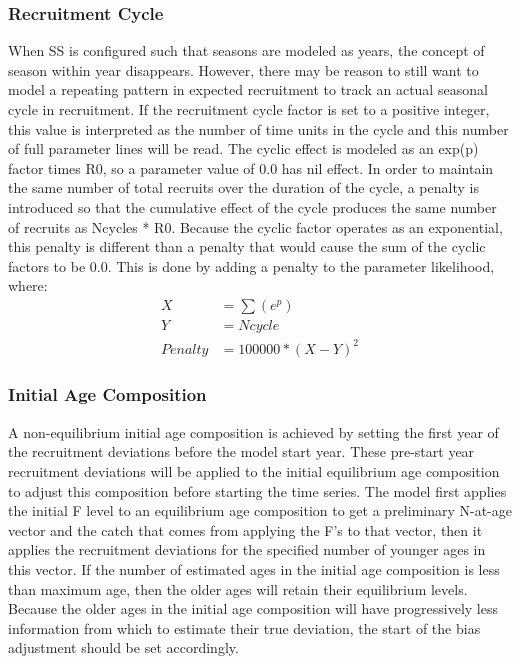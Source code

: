 \subsubsection{Recruitment Cycle}
When SS is configured such that seasons are modeled as years, the concept of season within year disappears.  However, there may be reason to still want to model a repeating pattern in expected recruitment to track an actual seasonal cycle in recruitment.  If the recruitment cycle factor is set to a positive integer, this value is interpreted as the number of time units in the cycle and this number of full parameter lines will be read. The cyclic effect is modeled as an exp(p) factor times R0, so a parameter value of 0.0 has nil effect. In order to maintain the same number of total recruits over the duration of the cycle, a penalty is introduced so that the cumulative effect of the cycle produces the same number of recruits as Ncycles * R0. Because the cyclic factor operates as an exponential, this penalty is different than a penalty that would cause the sum of the cyclic factors to be 0.0.  This is done by adding a penalty to the parameter likelihood, where:
\begin{equation}
	\begin{split}
				   X & = \sum(e^p)  \\
				   Y & = Ncycle  \\
				   Penalty & = 100000*(X-Y)^2
	\end{split}
\end{equation}

\subsubsection{Initial Age Composition}
A non-equilibrium initial age composition is achieved by setting the first year of the recruitment deviations before the model start year. These pre-start year recruitment deviations will be applied to the initial equilibrium age composition to adjust this composition before starting the time series. The model first applies the initial F level to an equilibrium age composition to get a preliminary N-at-age vector and the catch that comes from applying the F's to that vector, then it applies the recruitment deviations for the specified number of younger ages in this vector. If the number of estimated ages in the initial age composition is less than maximum age, then the older ages will retain their equilibrium levels. Because the older ages in the initial age composition will have progressively less information from which to estimate their true deviation, the start of the bias adjustment should be set accordingly.

